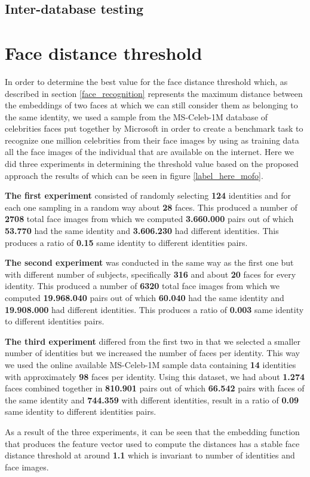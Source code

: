 \subsection{Inter-database testing}

\section{Face distance threshold}
In order to determine the best value for the face distance threshold which, as described in section \ref{face_recognition} represents the maximum distance between the embeddings of two faces at which we can still consider them as belonging to the same identity, we used a sample from the MS-Celeb-1M database of celebrities faces put together by Microsoft in order to create a benchmark task to recognize one million celebrities from their face images by using as training data all the face images of the individual that are available on the internet. Here we did three experiments in determining the threshold value based on the proposed approach the results of which can be seen in figure \ref{label_here_mofo}. 

\textbf{The first experiment} consisted of randomly selecting \textbf{124} identities and for each one sampling in a random way about \textbf{28} faces. This produced a number of \textbf{2708} total face images from which we computed \textbf{3.660.000} pairs out of which \textbf{53.770} had the same identity and \textbf{3.606.230} had different identities. This produces a ratio of \textbf{0.15} same identity to different identities pairs.

\textbf{The second experiment} was conducted in the same way as the first one but with different number of subjects, specifically \textbf{316} and about \textbf{20} faces for every identity. This produced a number of \textbf{6320} total face images from which we computed \textbf{19.968.040} pairs out of which \textbf{60.040} had the same identity and \textbf{19.908.000} had different identities. This produces a ratio of \textbf{0.003} same identity to different identities pairs.

\textbf{The third experiment} differed from the first two in that we selected a smaller number of identities but we increased the number of faces per identity. This way we used the online available MS-Celeb-1M sample data containing \textbf{14} identities with approximately \textbf{98} faces per identity. Using this dataset, we had about \textbf{1.274} faces combined together in \textbf{810.901} pairs out of which \textbf{66.542} pairs with faces of the same identity and \textbf{744.359} with different identities, result in a ratio of \textbf{0.09} 	same identity to different identities pairs.

As a result of the three experiments, it can be seen that the embedding function that produces the feature vector used to compute the distances has a stable face distance threshold at around \textbf{1.1} which is invariant to number of identities and face images.